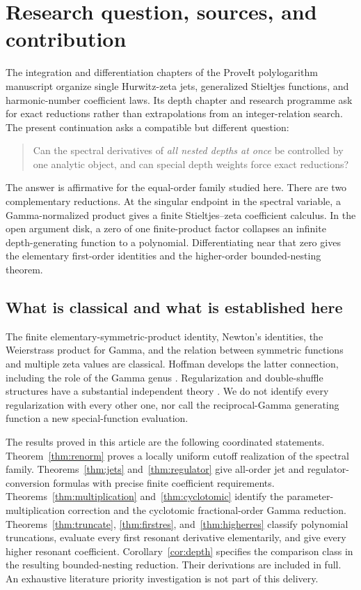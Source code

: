 \documentclass[11pt]{article}
\numberwithin{equation}{section}
\theoremstyle{definition}\newtheorem{definition}[theorem]{Definition}
\theoremstyle{remark}\newtheorem{remark}[theorem]{Remark}
\begin{document}
\section{Research question, sources, and contribution}
\label{sec:scope}
The integration and differentiation chapters of the ProveIt polylogarithm
manuscript organize single Hurwitz-zeta jets, generalized Stieltjes functions,
and harmonic-number coefficient laws. Its depth chapter and research
programme ask for exact reductions rather than extrapolations from an
integer-relation search. The present continuation asks a compatible but
different question:
\begin{quote}
Can the spectral derivatives of \emph{all nested depths at once} be controlled
by one analytic object, and can special depth weights force exact reductions?
\end{quote}
The answer is affirmative for the equal-order family studied here. There are
two complementary reductions. At the singular endpoint in the spectral
variable, a Gamma-normalized product gives a finite Stieltjes--zeta
coefficient calculus. In the open argument disk, a zero of one finite-product
factor collapses an infinite depth-generating function to a polynomial.
Differentiating near that zero gives the elementary first-order identities
and the higher-order bounded-nesting theorem.

\subsection{What is classical and what is established here}
The finite elementary-symmetric-product identity, Newton's identities,
the Weierstrass product for Gamma, and the relation between symmetric functions
and multiple zeta values are classical. Hoffman develops the latter connection,
including the role of the Gamma genus \cite{Hoffman2008,Hoffman2016}.
Regularization and double-shuffle structures have a substantial independent
theory \cite{IKZ2006,GuoZhang2010}. We do not identify every regularization with
every other one, nor call the reciprocal-Gamma generating function a new
special-function evaluation.

The results proved in this article are the following coordinated statements.
Theorem~\ref{thm:renorm} proves a locally uniform cutoff realization of the
spectral family. Theorems~\ref{thm:jets} and~\ref{thm:regulator} give all-order
jet and regulator-conversion formulas with precise finite coefficient
requirements. Theorems~\ref{thm:multiplication} and~\ref{thm:cyclotomic}
identify the parameter-multiplication correction and the cyclotomic
fractional-order Gamma reduction. Theorems~\ref{thm:truncate},
\ref{thm:firstres}, and~\ref{thm:higherres} classify polynomial truncations,
evaluate every first resonant derivative elementarily, and give every higher
resonant coefficient. Corollary~\ref{cor:depth} specifies the comparison class
in the resulting bounded-nesting reduction. Their derivations are included
in full. An exhaustive literature priority investigation is not part of
this delivery.
\end{document}
